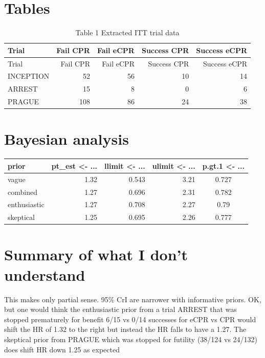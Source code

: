 \documentclass[
  super,
  preprint,
  3p]{elsarticle}
\begin{document}
\newpage

\hypertarget{tables}{%
\section{Tables}\label{tables}}

\begin{longtable}[]{@{}lrrrr@{}}
\caption{Table 1 Extracted ITT trial data}\tabularnewline
\toprule()
Trial & Fail CPR & Fail eCPR & Success CPR & Success eCPR \\
\midrule()
\endfirsthead
\toprule()
Trial & Fail CPR & Fail eCPR & Success CPR & Success eCPR \\
\midrule()
\endhead
INCEPTION & 52 & 56 & 10 & 14 \\
ARREST & 15 & 8 & 0 & 6 \\
PRAGUE & 108 & 86 & 24 & 38 \\
\bottomrule()
\end{longtable}

\hypertarget{bayesian-analysis}{%
\section{Bayesian analysis}\label{bayesian-analysis}}

\begin{longtable}{lrrrc}
\toprule
prior & pt\_est <- ... & llimit <- ... & ulimit <- ... & p.gt.1 <- ... \\ 
\midrule
vague & 1.32 & 0.543 & 3.21 & 0.727 \\ 
combined & 1.27 & 0.696 & 2.31 & 0.782 \\ 
enthusiastic & 1.27 & 0.708 & 2.27 & 0.79 \\ 
skeptical & 1.25 & 0.695 & 2.26 & 0.777 \\ 
\bottomrule
\end{longtable}

\hypertarget{summary-of-what-i-dont-understand}{%
\section{\texorpdfstring{\textbf{Summary of what I don't
understand}}{Summary of what I don't understand}}\label{summary-of-what-i-dont-understand}}

This makes only partial sense. 95\% CrI are narrower with informative
priors. OK, but one would think the enthusiastic prior from a trial
ARREST that was stopped prematurely for benefit 6/15 vs 0/14 successes
for eCPR vs CPR would shift the HR of 1.32 to the right but instead the
HR falls to have a 1.27. The skeptical prior from PRAGUE which was
stopped for futility (38/124 vs 24/132) does shift HR down 1.25 as
expected
\end{document}
